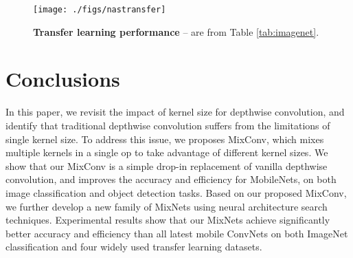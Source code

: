 \documentclass{sty/bmvc2k}
\begin{document}
\begin{table}                                            
  \centering                                                                        
  \vskip 0.1in
  \caption{                                                                         
	\small \textbf{Transfer learning datasets.}
  }                                                          
  \label{tab:transdataset}             
\end{table}    \begin{figure}                                           
	\centering                                                                  
	\texttt{[image: ./figs/nastransfer]}
	\vskip -0.1in
	\caption{
		\textbf{Transfer learning performance} --  are from Table \ref{tab:imagenet}.
	}
	\label{fig:nastransfer}
\end{figure}
 





\section{Conclusions}
\label{sec:conclude}

In this paper, we revisit the impact of kernel size for depthwise convolution, and identify that traditional depthwise convolution suffers from the limitations of single kernel size. To address this issue, we  proposes MixConv, which mixes multiple kernels in a single op to take advantage of different kernel sizes. We show that our MixConv is a simple drop-in replacement of vanilla depthwise convolution, and improves the accuracy and efficiency for MobileNets, on both image classification and object detection tasks. Based on our proposed MixConv, we further develop a new family of MixNets using neural architecture search techniques. Experimental results show that our MixNets achieve significantly better accuracy and efficiency than all latest mobile ConvNets on both ImageNet classification and four widely used transfer learning datasets. 

\end{document}
